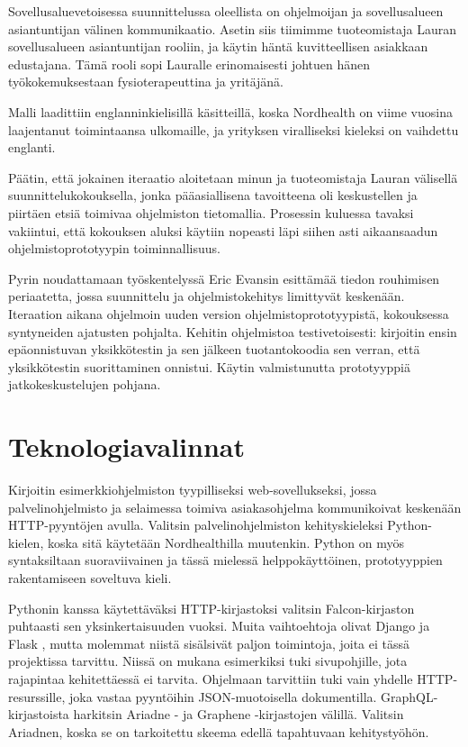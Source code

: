 Sovellusaluevetoisessa suunnittelussa oleellista on ohjelmoijan ja
sovellusalueen asiantuntijan välinen kommunikaatio. Asetin siis tiimimme
tuoteomistaja Lauran sovellusalueen asiantuntijan rooliin, ja käytin
häntä kuvitteellisen asiakkaan edustajana. Tämä rooli sopi Lauralle
erinomaisesti johtuen hänen työkokemuksestaan fysioterapeuttina ja
yritäjänä.

Malli laadittiin englanninkielisillä käsitteillä, koska Nordhealth on
viime vuosina laajentanut toimintaansa ulkomaille, ja yrityksen
viralliseksi kieleksi on vaihdettu englanti.

Päätin, että jokainen iteraatio aloitetaan minun ja tuoteomistaja Lauran
välisellä suunnittelukokouksella, jonka pääasiallisena tavoitteena oli
keskustellen ja piirtäen etsiä toimivaa ohjelmiston tietomallia.
Prosessin kuluessa tavaksi vakiintui, että kokouksen aluksi käytiin
nopeasti läpi siihen asti aikaansaadun ohjelmistoprototyypin
toiminnallisuus.

Pyrin noudattamaan työskentelyssä Eric Evansin esittämää tiedon
rouhimisen periaatetta, jossa suunnittelu ja ohjelmistokehitys
limittyvät keskenään. Iteraation aikana ohjelmoin uuden version
ohjelmistoprototyypistä, kokouksessa syntyneiden ajatusten pohjalta.
Kehitin ohjelmistoa testivetoisesti: kirjoitin ensin epäonnistuvan
yksikkötestin ja sen jälkeen tuotantokoodia sen verran, että
yksikkötestin suorittaminen onnistui. Käytin valmistunutta prototyyppiä
jatkokeskustelujen pohjana.

\hypertarget{teknologiavalinnat}{%
\section{Teknologiavalinnat}\label{teknologiavalinnat}}

Kirjoitin esimerkkiohjelmiston tyypilliseksi web-sovellukseksi, jossa
palvelinohjelmisto ja selaimessa toimiva asiakasohjelma kommunikoivat
keskenään HTTP-pyyntöjen avulla. Valitsin palvelinohjelmiston
kehityskieleksi Python-kielen, koska sitä käytetään Nordhealthilla
muutenkin. Python on myös syntaksiltaan suoraviivainen ja tässä mielessä
helppokäyttöinen, prototyyppien rakentamiseen soveltuva kieli.

Pythonin kanssa käytettäväksi HTTP-kirjastoksi valitsin Falcon-kirjaston
\cite{FalconPython} puhtaasti sen yksinkertaisuuden vuoksi. Muita
vaihtoehtoja olivat Django ja Flask \cite{FlaskPython}, mutta molemmat
niistä sisälsivät paljon toimintoja, joita ei tässä projektissa
tarvittu. Niissä on mukana esimerkiksi tuki sivupohjille, jota
rajapintaa kehitettäessä ei tarvita. Ohjelmaan tarvittiin tuki vain
yhdelle HTTP-resurssille, joka vastaa pyyntöihin JSON-muotoisella
dokumentilla. GraphQL-kirjastoista harkitsin Ariadne
\cite{AriadnePython}- ja Graphene \cite{GraphenePython} -kirjastojen
välillä. Valitsin Ariadnen, koska se on tarkoitettu skeema edellä
tapahtuvaan kehitystyöhön.


